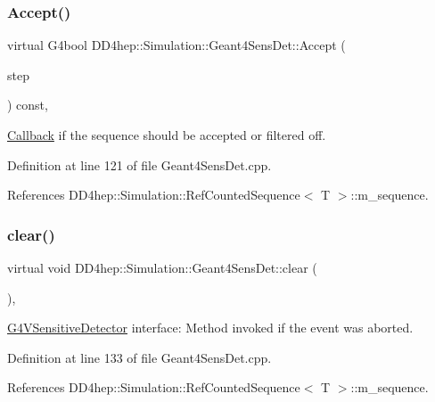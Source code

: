 \subsubsection{\texorpdfstring{Accept()}{Accept()}}
{\footnotesize\ttfamily virtual G4bool D\+D4hep\+::\+Simulation\+::\+Geant4\+Sens\+Det\+::\+Accept (\begin{DoxyParamCaption}\item[{const G4\+Step $\ast$}]{step }\end{DoxyParamCaption}) const\hspace{0.3cm}{\ttfamily [inline]}, {\ttfamily [virtual]}}



\hyperlink{class_d_d4hep_1_1_callback}{Callback} if the sequence should be accepted or filtered off. 



Definition at line 121 of file Geant4\+Sens\+Det.\+cpp.



References D\+D4hep\+::\+Simulation\+::\+Ref\+Counted\+Sequence$<$ T $>$\+::m\+\_\+sequence.

\hypertarget{class_d_d4hep_1_1_simulation_1_1_geant4_sens_det_a6840565286dac4c3b705d86589010e37}{}\label{class_d_d4hep_1_1_simulation_1_1_geant4_sens_det_a6840565286dac4c3b705d86589010e37} 
\subsubsection{\texorpdfstring{clear()}{clear()}}
{\footnotesize\ttfamily virtual void D\+D4hep\+::\+Simulation\+::\+Geant4\+Sens\+Det\+::clear (\begin{DoxyParamCaption}{ }\end{DoxyParamCaption})\hspace{0.3cm}{\ttfamily [inline]}, {\ttfamily [virtual]}}



\hyperlink{class_g4_v_sensitive_detector}{G4\+V\+Sensitive\+Detector} interface\+: Method invoked if the event was aborted. 



Definition at line 133 of file Geant4\+Sens\+Det.\+cpp.



References D\+D4hep\+::\+Simulation\+::\+Ref\+Counted\+Sequence$<$ T $>$\+::m\+\_\+sequence.

